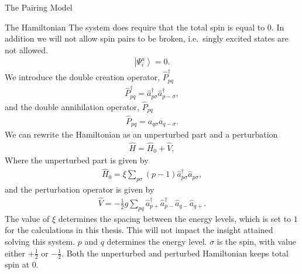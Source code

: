 \documentclass[twoside,english]{uiofysmaster}
\begin{document}
\begin{chapter}{The Pairing Model}
\begin{section}{The Hamiltonian}
		The system does require that the total spin is equal
                to $0$. In addition we will not allow spin pairs to be
                broken, i.e.\ singly excited states are not allowed.
		\begin{align}
			\left| \Psi_i^a \right> = 0.
		\end{align}	
		We introduce the double creation operator, $\hat P_{pq}^{\dagger}$
		\begin{align}
			\hat P_{pq}^{\dagger} = \hat a_{p \sigma}^{\dagger} \hat a_{p -\sigma}^{\dagger},
		\end{align}
		and the double annihilation operator, $\hat P_{pq}$
		\begin{align}
			\hat P_{pq} =  a_{q \sigma} a_{q -\sigma}.
		\end{align}
		We can rewrite the Hamiltonian as an unperturbed part and a perturbation
		\begin{align}
			\hat H = \hat H_0 + \hat V,
		\end{align}
		Where the unperturbed part is given by 
		\begin{align}
			\hat H_0 = \xi \sum_{p \sigma} (p-1) \hat a_{p \sigma}^{\dagger} \hat a_{p \sigma},
		\end{align}
		and the perturbation operator is given by
		\begin{align}
			\hat V = - \frac{1}{2}g \sum_{pq} \hat a_{p +}^{\dagger} \hat a_{p-}^{\dagger} \hat a_{q-} \hat a_{q+}.
		\end{align}
		The value of $\xi$ determines the spacing between the energy levels, which is set to $1$ for the calculations in this thesis. This will not impact the insight attained solving this system. $p$ and $q$ determines the energy level. $\sigma$ is the spin, with value either $+\frac{1}{2}$ or $-\frac{1}{2}$. Both the unperturbed and perturbed Hamiltonian keeps total spin at $0$.


\end{section}
\end{chapter}
\end{document}
